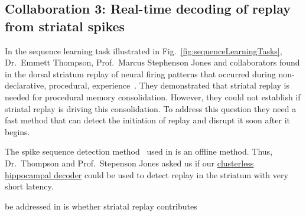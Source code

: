 \subsection{Collaboration 3: Real-time decoding of replay from striatal spikes}

In the sequence learning task illustrated in
Fig.~\ref{fig:sequenceLearningTasks}, Dr.~Emmett Thompson, Prof.~Marcus
Stephenson Jones and collaborators found in the dorsal striatum replay of
neural firing patterns that occurred during non-declarative, procedural,
experience~\citep{thompsonEtAl24}.
%
They demonstrated that striatal replay is needed for procedural memory
consolidation.
%
However, they could not establish if striatal replay is driving this
consolidation.
%
To address this question they need a fast method that can detect the initiation
of replay and disrupt it soon after it begins.

The spike sequence detection method~\citep{williamsEtAl20} used in
\citet{thompsonEtAl24} is an offline method. Thus, Dr.~Thompson and
Prof.~Stepenson Jones asked us if our
\href{https://bonsai-rx.org/machinelearning/examples/examples/PointProcessDecoder/DecodePositionFromHippocampusClusterless/README.html}{clusterless
hippocampal decoder} could be used to detect replay in the striatum with very
short latency.



be addressed in \citet{thompsonEtAl24} is
whether striatal replay contributes
